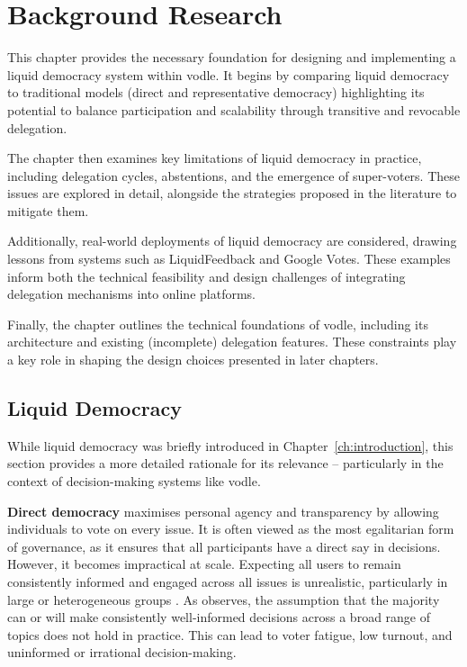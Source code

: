 \chapter{Background Research}\label{ch:background}

This chapter provides the necessary foundation for designing and implementing a liquid democracy system within vodle. It begins by comparing liquid democracy to traditional models (direct and representative democracy) highlighting its potential to balance participation and scalability through transitive and revocable delegation.

The chapter then examines key limitations of liquid democracy in practice, including delegation cycles, abstentions, and the emergence of super-voters. These issues are explored in detail, alongside the strategies proposed in the literature to mitigate them.

Additionally, real-world deployments of liquid democracy are considered, drawing lessons from systems such as LiquidFeedback and Google Votes. These examples inform both the technical feasibility and design challenges of integrating delegation mechanisms into online platforms.

Finally, the chapter outlines the technical foundations of vodle, including its architecture and existing (incomplete) delegation features. These constraints play a key role in shaping the design choices presented in later chapters.

\section{Liquid Democracy}

While liquid democracy was briefly introduced in Chapter~\ref{ch:introduction}, this section provides a more detailed rationale for its relevance -- particularly in the context of decision-making systems like vodle.

\textbf{Direct democracy} maximises personal agency and transparency by allowing individuals to vote on every issue. It is often viewed as the most egalitarian form of governance, as it ensures that all participants have a direct say in decisions. However, it becomes impractical at scale. Expecting all users to remain consistently informed and engaged across all issues is unrealistic, particularly in large or heterogeneous groups \citep{ford_delegative_2002}. As \citeauthor{ford_delegative_2002} observes, the assumption that the majority can or will make consistently well-informed decisions across a broad range of topics does not hold in practice. This can lead to voter fatigue, low turnout, and uninformed or irrational decision-making.

